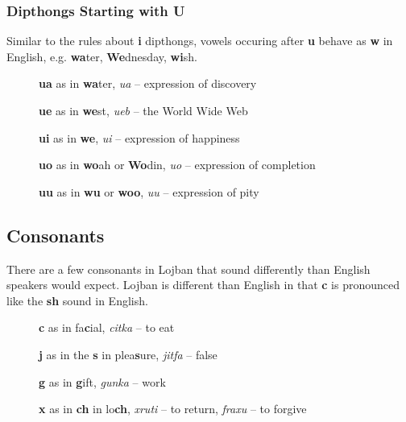 \documentclass[12pt]{book}
\begin{document}

\subsubsection{Dipthongs Starting with U}

Similar to the rules about \textbf{i} dipthongs, vowels occuring after \textbf{u} behave as \textbf{w} in English, e.g. \textbf{wa}ter, \textbf{We}dnesday, \textbf{wi}sh. 


\begin{description}
\item[ ] \textbf{ua} as in \textbf{wa}ter, \emph{ua} -- expression of discovery
\item[ ] \textbf{ue} as in \textbf{we}st, \emph{ueb} -- the World Wide Web
\item[ ] \textbf{ui} as in \textbf{we}, \emph{ui} -- expression of happiness 
\item[ ] \textbf{uo} as in \textbf{wo}ah or \textbf{Wo}din, \emph{uo} -- expression of completion
\item[ ] \textbf{uu} as in \textbf{wu} or \textbf{woo}, \emph{uu} -- expression of pity 
\end{description}


\subsection{Consonants}

There are a few consonants in Lojban that sound differently than English speakers would expect.
Lojban is different than English in that \textbf{c} is pronounced like the \textbf{sh} sound in English. 

\begin{description}
\item[ ] \textbf{c} as in fa\textbf{c}ial, \emph{citka} -- to eat
\item[ ] \textbf{j} as in the \textbf{s} in plea\textbf{s}ure, \emph{jitfa} -- false
\item[ ] \textbf{g} as in \textbf{g}ift, \emph{gunka} -- work
\item[ ] \textbf{x} as in \textbf{ch} in lo\textbf{ch}, \emph{xruti} -- to return, \emph{fraxu} -- to forgive
\end{description}
\end{document}
